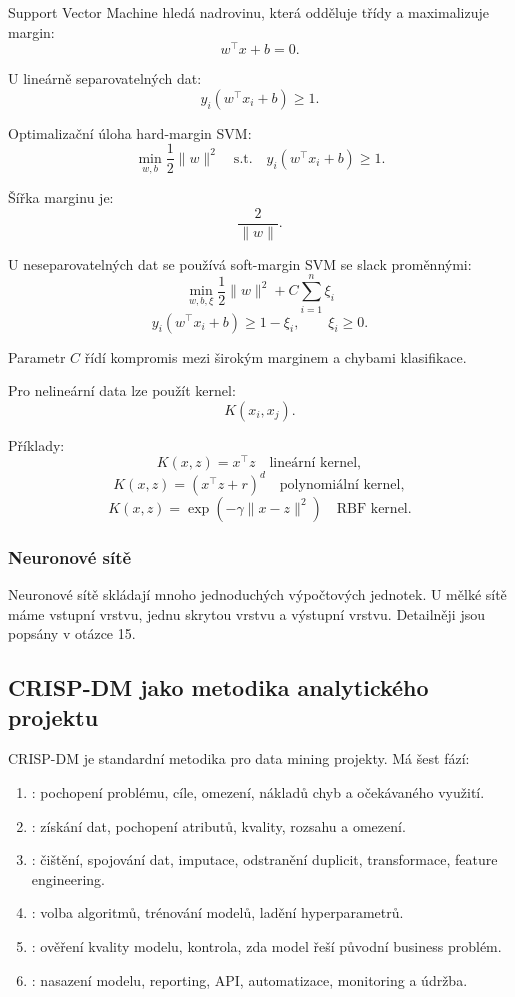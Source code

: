 Support Vector Machine hledá nadrovinu, která odděluje třídy a maximalizuje margin:
\[
w^\top x + b = 0.
\]

U lineárně separovatelných dat:
\[
y_i(w^\top x_i+b)\geq 1.
\]

Optimalizační úloha hard-margin SVM:
\[
\min_{w,b}\frac{1}{2}\|w\|^2
\quad
\text{s.t.}
\quad
y_i(w^\top x_i+b)\geq 1.
\]

Šířka marginu je:
\[
\frac{2}{\|w\|}.
\]

U neseparovatelných dat se používá soft-margin SVM se slack proměnnými:
\[
\min_{w,b,\xi}
\frac{1}{2}\|w\|^2 + C\sum_{i=1}^n \xi_i
\]
\[
y_i(w^\top x_i+b)\geq 1-\xi_i,
\qquad
\xi_i\geq 0.
\]

Parametr $C$ řídí kompromis mezi širokým marginem a chybami klasifikace.

Pro nelineární data lze použít kernel:
\[
K(x_i,x_j).
\]

Příklady:
\[
K(x,z)=x^\top z
\quad \text{lineární kernel},
\]
\[
K(x,z)=(x^\top z+r)^d
\quad \text{polynomiální kernel},
\]
\[
K(x,z)=\exp(-\gamma\|x-z\|^2)
\quad \text{RBF kernel}.
\]

\subsubsection{Neuronové sítě}

Neuronové sítě skládají mnoho jednoduchých výpočtových jednotek. U mělké sítě máme vstupní vrstvu, jednu
skrytou vrstvu a výstupní vrstvu. Detailněji jsou popsány v otázce 15.

\subsection{CRISP-DM jako metodika analytického projektu}

CRISP-DM je standardní metodika pro data mining projekty. Má šest fází:

\begin{enumerate}
    \item {}:
    pochopení problému, cíle, omezení, nákladů chyb a očekávaného využití.
    
    \item {}:
    získání dat, pochopení atributů, kvality, rozsahu a omezení.
    
    \item {}:
    čištění, spojování dat, imputace, odstranění duplicit, transformace, feature engineering.
    
    \item {}:
    volba algoritmů, trénování modelů, ladění hyperparametrů.
    
    \item {}:
    ověření kvality modelu, kontrola, zda model řeší původní business problém.
    
    \item {}:
    nasazení modelu, reporting, API, automatizace, monitoring a údržba.
\end{enumerate}

